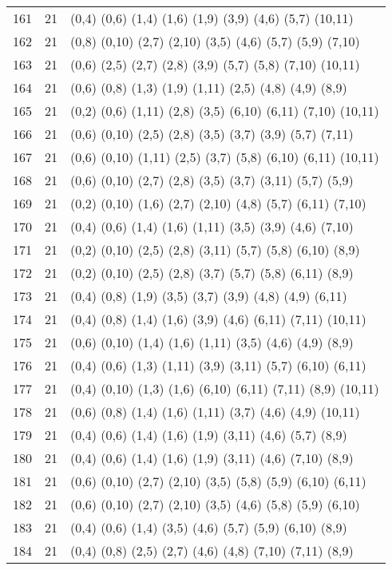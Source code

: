 {\begin{longtable}{lll}
161 & 21 & (0,4) (0,6) (1,4) (1,6) (1,9) (3,9) (4,6) (5,7) (10,11) \\
162 & 21 & (0,8) (0,10) (2,7) (2,10) (3,5) (4,6) (5,7) (5,9) (7,10) \\
163 & 21 & (0,6) (2,5) (2,7) (2,8) (3,9) (5,7) (5,8) (7,10) (10,11) \\
164 & 21 & (0,6) (0,8) (1,3) (1,9) (1,11) (2,5) (4,8) (4,9) (8,9) \\
165 & 21 & (0,2) (0,6) (1,11) (2,8) (3,5) (6,10) (6,11) (7,10) (10,11) \\
166 & 21 & (0,6) (0,10) (2,5) (2,8) (3,5) (3,7) (3,9) (5,7) (7,11) \\
167 & 21 & (0,6) (0,10) (1,11) (2,5) (3,7) (5,8) (6,10) (6,11) (10,11) \\
168 & 21 & (0,6) (0,10) (2,7) (2,8) (3,5) (3,7) (3,11) (5,7) (5,9) \\
169 & 21 & (0,2) (0,10) (1,6) (2,7) (2,10) (4,8) (5,7) (6,11) (7,10) \\
170 & 21 & (0,4) (0,6) (1,4) (1,6) (1,11) (3,5) (3,9) (4,6) (7,10) \\
171 & 21 & (0,2) (0,10) (2,5) (2,8) (3,11) (5,7) (5,8) (6,10) (8,9) \\
172 & 21 & (0,2) (0,10) (2,5) (2,8) (3,7) (5,7) (5,8) (6,11) (8,9) \\
173 & 21 & (0,4) (0,8) (1,9) (3,5) (3,7) (3,9) (4,8) (4,9) (6,11) \\
174 & 21 & (0,4) (0,8) (1,4) (1,6) (3,9) (4,6) (6,11) (7,11) (10,11) \\
175 & 21 & (0,6) (0,10) (1,4) (1,6) (1,11) (3,5) (4,6) (4,9) (8,9) \\
176 & 21 & (0,4) (0,6) (1,3) (1,11) (3,9) (3,11) (5,7) (6,10) (6,11) \\
177 & 21 & (0,4) (0,10) (1,3) (1,6) (6,10) (6,11) (7,11) (8,9) (10,11) \\
178 & 21 & (0,6) (0,8) (1,4) (1,6) (1,11) (3,7) (4,6) (4,9) (10,11) \\
179 & 21 & (0,4) (0,6) (1,4) (1,6) (1,9) (3,11) (4,6) (5,7) (8,9) \\
180 & 21 & (0,4) (0,6) (1,4) (1,6) (1,9) (3,11) (4,6) (7,10) (8,9) \\
181 & 21 & (0,6) (0,10) (2,7) (2,10) (3,5) (5,8) (5,9) (6,10) (6,11) \\
182 & 21 & (0,6) (0,10) (2,7) (2,10) (3,5) (4,6) (5,8) (5,9) (6,10) \\
183 & 21 & (0,4) (0,6) (1,4) (3,5) (4,6) (5,7) (5,9) (6,10) (8,9) \\
184 & 21 & (0,4) (0,8) (2,5) (2,7) (4,6) (4,8) (7,10) (7,11) (8,9) \\

\end{longtable}}
